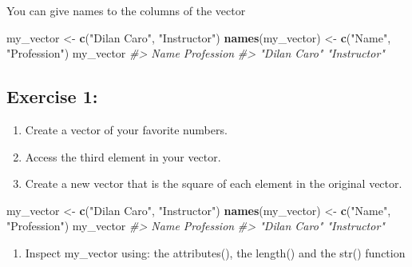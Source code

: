 \documentclass[
]{book}
\newenvironment{Shaded}{\begin{snugshade}}{\end{snugshade}}
\newcommand{\CommentTok}[1]{\textcolor[rgb]{0.56,0.35,0.01}{\textit{#1}}}
\newcommand{\FunctionTok}[1]{\textcolor[rgb]{0.13,0.29,0.53}{\textbf{#1}}}
\newcommand{\NormalTok}[1]{#1}
\newcommand{\OtherTok}[1]{\textcolor[rgb]{0.56,0.35,0.01}{#1}}
\newcommand{\StringTok}[1]{\textcolor[rgb]{0.31,0.60,0.02}{#1}}
\providecommand{\tightlist}{%
  \setlength{\itemsep}{0pt}\setlength{\parskip}{0pt}}
\begin{document}
You can give names to the columns of the vector

\begin{Shaded}
\begin{Highlighting}[]
\NormalTok{my\_vector }\OtherTok{\textless{}{-}} \FunctionTok{c}\NormalTok{(}\StringTok{"Dilan Caro"}\NormalTok{, }\StringTok{"Instructor"}\NormalTok{)}
\FunctionTok{names}\NormalTok{(my\_vector) }\OtherTok{\textless{}{-}} \FunctionTok{c}\NormalTok{(}\StringTok{"Name"}\NormalTok{, }\StringTok{"Profession"}\NormalTok{)}
\NormalTok{my\_vector}
\CommentTok{\#\textgreater{}         Name   Profession }
\CommentTok{\#\textgreater{} "Dilan Caro" "Instructor"}
\end{Highlighting}
\end{Shaded}

\subsection*{Exercise 1:}\label{exercise-1-1}

\begin{enumerate}
\def\labelenumi{\arabic{enumi}.}
\tightlist
\item
  Create a vector of your favorite numbers.
\item
  Access the third element in your vector.
\item
  Create a new vector that is the square of each element in the original vector.
\end{enumerate}

\begin{Shaded}
\begin{Highlighting}[]
\NormalTok{my\_vector }\OtherTok{\textless{}{-}} \FunctionTok{c}\NormalTok{(}\StringTok{"Dilan Caro"}\NormalTok{, }\StringTok{"Instructor"}\NormalTok{)}
\FunctionTok{names}\NormalTok{(my\_vector) }\OtherTok{\textless{}{-}} \FunctionTok{c}\NormalTok{(}\StringTok{"Name"}\NormalTok{, }\StringTok{"Profession"}\NormalTok{)}
\NormalTok{my\_vector}
\CommentTok{\#\textgreater{}         Name   Profession }
\CommentTok{\#\textgreater{} "Dilan Caro" "Instructor"}
\end{Highlighting}
\end{Shaded}

\begin{enumerate}
\def\labelenumi{\arabic{enumi}.}
\setcounter{enumi}{3}
\tightlist
\item
  Inspect my\_vector using:
  the attributes(), the length() and the str() function
\end{enumerate}
\end{document}
